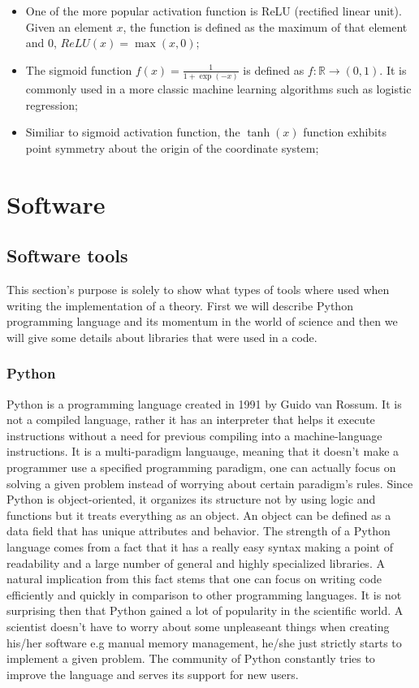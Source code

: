 \documentclass[a4paper,oneside,openright,11pt]{book}
\begin{document}
\begin{itemize}
    \item One of the more popular activation function is ReLU (rectified linear unit). Given an element $x$, the function is defined as the maximum of that element and $0$, $ReLU(x) = \max(x, 0)$;
    \item The sigmoid function $f(x) = \frac{1}{1 + \exp(-x)}$ is defined as $f: \mathbb{R} \rightarrow (0, 1)$. It is commonly used in a more classic machine learning algorithms such as logistic regression;
    \item Similiar to sigmoid activation function, the $\tanh(x)$ function exhibits point symmetry about the origin of the coordinate system;
\end{itemize}



\chapter{Software}

\section{Software tools}

This section's purpose is solely to show what types of tools where used when writing the implementation of a theory. First we will describe Python programming language and its momentum in the world of science and then we will give some details about libraries that were used in a code.

\subsection{Python }

Python \cite{Python} is a programming language created in 1991 by Guido van Rossum. It is not a compiled language, rather it has an interpreter that helps it execute instructions without a need for previous compiling into a machine-language instructions. It is a multi-paradigm languauge, meaning that it doesn't make a programmer use a specified programming paradigm, one can actually focus on solving a given problem instead of worrying about certain paradigm's rules. Since Python is object-oriented, it organizes its structure not by using logic and functions but it treats everything as an object. An object can be defined as a data field that has unique attributes and behavior. The strength of a Python language comes from a fact that it has a really easy syntax making a point of readability and a large number of general and highly specialized libraries. A natural implication from this fact stems that one can focus on writing code efficiently and quickly in comparison to other programming languages. It is not surprising then that Python gained a lot of popularity in the scientific world. A scientist doesn't have to worry about some unpleaseant things when creating his/her software e.g manual memory management, he/she just strictly starts to implement a given problem. The community of Python constantly tries to improve the language and serves its support for new users.
\end{document}
